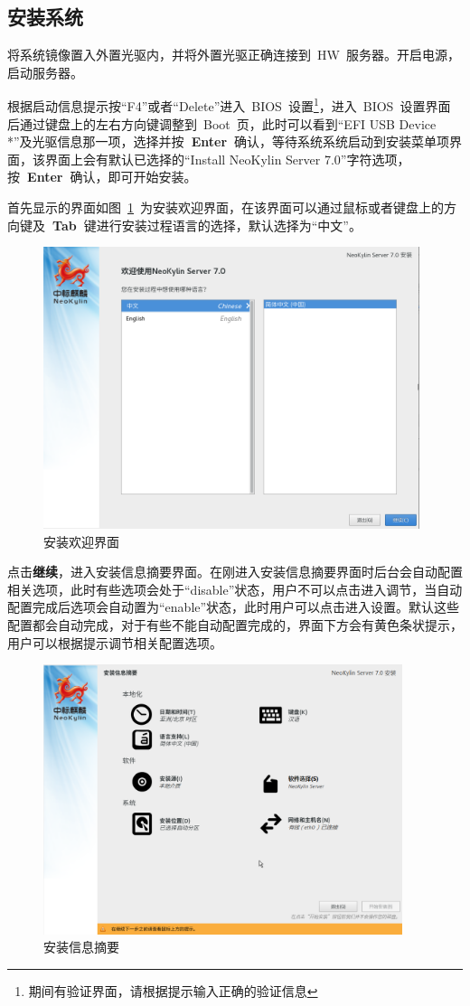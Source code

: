 \documentclass[a4paper]{ctexart}
\begin{document}
\subsection{安装系统}
将系统镜像置入外置光驱内，并将外置光驱正确连接到~HW~服务器。开启电源，启动服务器。

根据启动信息提示按“F4”或者“Delete”进入~BIOS~设置\footnote{期间有验证界面，请根据提示输入正确的验证信息}，进入~BIOS~设置界面后通过键盘上的左右方向键调整到~Boot~页，此时可以看到“EFI USB Device *”及光驱信息那一项，选择并按\textbf{~Enter~}确认，等待系统系统启动到安装菜单项界面，该界面上会有默认已选择的“Install NeoKylin Server 7.0”字符选项，按\textbf{~Enter~}确认，即可开始安装。

首先显示的界面如图~\ref{fig:welcome-install}~为安装欢迎界面，在该界面可以通过鼠标或者键盘上的方向键及\textbf{~Tab~}键进行安装过程语言的选择，默认选择为“中文”。

\begin{figure}[htp]
	\centering
	\includegraphics[width=11cm]{ns7/welcome-installation}
	\caption{安装欢迎界面}\label{fig:welcome-install}
\end{figure}

点击\textbf{继续}，进入安装信息摘要界面。在刚进入安装信息摘要界面时后台会自动配置相关选项，此时有些选项会处于“disable”状态，用户不可以点击进入调节，当自动配置完成后选项会自动置为“enable”状态，此时用户可以点击进入设置。默认这些配置都会自动完成，对于有些不能自动配置完成的，界面下方会有黄色条状提示，用户可以根据提示调节相关配置选项。

\begin{figure}[htp]
	\centering
	\includegraphics[width=10.5cm]{ns7/set-installation-info}
	\caption{安装信息摘要}\label{fig:set-installation-info}
\end{figure}
\end{document}
